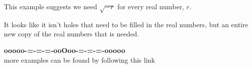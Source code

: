 \documentclass{ximera}
\begin{document}
This example suggests we need $\sqrt{-r}$ for every real number, $r$. 





It looks like it isn't holes that need to be filled in the real numbers, but an entire new copy of the real numbers that is needed.








\begin{center}
\textbf{\textcolor{green!50!black}{ooooo-=-=-=-ooOoo-=-=-=-ooooo}} \\

more examples can be found by following this link\\ 

\end{center}
\end{document}

